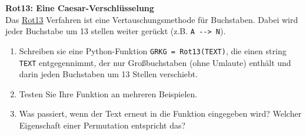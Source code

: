 \textbf{Rot13: Eine Caesar-Verschlüsselung}\\
Das \href{https://de.wikipedia.org/wiki/ROT13}{Rot13} Verfahren ist eine Vertauschungsmethode für Buchstaben. Dabei wird jeder Buchstabe um 13 stellen weiter gerückt (z.B. \verb|A --> N|).

\begin{enumerate}
	\item Schreiben sie eine Python-Funktion \verb|GRKG = Rot13(TEXT)|, die einen string \texttt{TEXT} entgegennimmt, der nur Großbuchstaben (ohne Umlaute) enthält und darin jeden Buchstaben um 13 Stellen verschiebt.
	\item Testen Sie Ihre Funktion an mehreren Beispielen.
	\item Was passiert, wenn der Text erneut in die Funktion eingegeben wird? Welcher Eigenschaft einer Permutation entspricht das?
\end{enumerate}